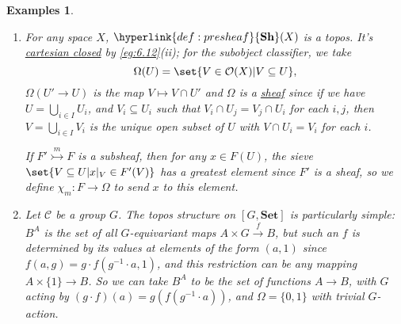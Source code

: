 \documentclass{article}
\newtheorem{nexample}[nthm]{Examples}
\begin{document}
\begin{nexample}
\begin{enumerate}[label=(\alph*)]
      Given $B \xrightarrow{f} A$ and a sieve $R$ on $A$, we define $f^* R$ to be the set of $g$ with codomain $B$ such that $fg \in R$.
      This makes $\Omega$ into a \hyperlink{def:funct}{functor} $\mathscr{C}^{\text{op}} \to \mathbf{Set}$, as follows.
      $\top: 1 \to \Omega$ is defined by $\top_A(*) = \{\text{all morphisms with codomain }A\}$.
      Given a subfunctor $F' \overset{m}\rightarrowtail F$, we define $\chi_m:F \to \Omega$ by
      \begin{equation*}
        (\chi_m)_A(x) = \set{f : B \to A | Ff(x) \in F'(B)}.
      \end{equation*}
      This is the unique \hyperlink{def:nattrans}{natural transformation} making
      \begin{equation*}
        \begin{tikzcd}
          F' \rar \dar[tail]{m} & 1 \dar[tail]{\top} \\
          F \rar & \Omega
        \end{tikzcd}
      \end{equation*}
      a \hyperlink{def:pullback}{pullback}.
    \item For any space $X$, $\hyperlink{def:presheaf}{\mathbf{Sh}}(X)$ is a topos.
      It's \hyperlink{def:cc}{cartesian closed} by \cref{eg:6.12}(ii); for the subobject classifier, we take
      \begin{equation*}\Omega(U)  = \set{V \in \mathcal{O}(X) | V \subseteq U},\end{equation*}
      $\Omega(U' \to U)$ is the map $V \mapsto V \cap U'$ and $\Omega$ is a \hyperlink{def:presheaf}{sheaf} since if we have $U = \bigcup_{i \in I} U_i$, and $V_i \subseteq U_i$ such that $V_i \cap U_j = V_j \cap U_i$ for each $i,j$,
      then $V = \bigcup_{i \in I} V_i$ is the unique open subset of $U$ with $V \cap U_i = V_i$ for each $i$.

      If $F' \overset{m}\rightarrowtail F$ is a subsheaf, then for any $x \in F(U)$, the sieve $\set{V \subseteq U | x|_V \in F'(V)}$ has a greatest element since $F'$ is a sheaf, so we define $\chi_m: F \to \Omega$ to send $x$ to this element.
    \item Let $\mathscr{C}$ be a group $G$.
      The topos structure on $[G, \mathbf{Set}]$ is particularly simple: $B^A$ is the set of all $G$-equivariant maps $A \times G \xrightarrow{f} B$, but such an $f$ is determined by its values at elements of the form $(a,1)$ since $f(a,g) = g \cdot f(g^{-1} \cdot a, 1)$, and this restriction can be any mapping $A \times \{1\} \to B$.
      So we can take $B^A$ to be the set of functions $A \to B$, with $G$ acting by $(g \cdot f) (a) = g (f (g^{-1} \cdot a))$, and $\Omega = \{0,1\}$ with trivial $G$-action.


\end{enumerate}
\end{nexample}
\end{document}
